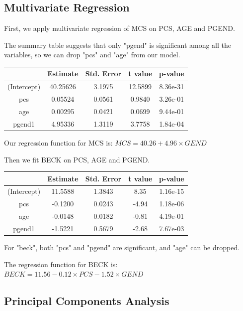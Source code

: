 \documentclass{article}
\begin{document}
    \subsection{Multivariate Regression}
      First, we apply multivariate regression of MCS on PCS, AGE and PGEND.

      The summary table suggests that only "pgend" is significant among all the variables, so we can drop "pcs" and "age" from our model.

      \begin{center}
      \begin{tabular}{c c c c c}
        \hline
          &Estimate&Std. Error    & t value & p-value\\
        \hline
          (Intercept)& 40.25626 &3.1975& 12.5899& 8.36e-31\\
          pcs & 0.05524& 0.0561 & 0.9840& 3.26e-01\\
          age & 0.00295& 0.0421 & 0.0699& 9.44e-01\\
          pgend1& 4.95336& 1.3119 & 3.7758& 1.84e-04\\
        \hline
      \end{tabular}
      \end{center}

      Our regression function for MCS is: $MCS = 40.26 + 4.96\times GEND$

      Then we fit BECK on PCS, AGE and PGEND.

      \begin{center}
      \begin{tabular}{c c c c c}
        \hline
          &Estimate&Std. Error & t value & p-value\\
        \hline
          (Intercept)& 11.5588& 1.3843 & 8.35 & 1.16e-15 \\
          pcs & -0.1200& 0.0243 & -4.94 & 1.18e-06\\
          age & -0.0148   &  0.0182&  -0.81 & 4.19e-01\\
          pgend1& -1.5221  &   0.5679 & -2.68  & 7.67e-03\\
        \hline
      \end{tabular}
      \end{center}

      For "beck", both "pcs" and "pgend" are significant, and "age" can be dropped.

      The regression function for BECK is: $BECK = 11.56 - 0.12\times PCS - 1.52\times GEND$

    \subsection{Principal Components Analysis}
\end{document}
